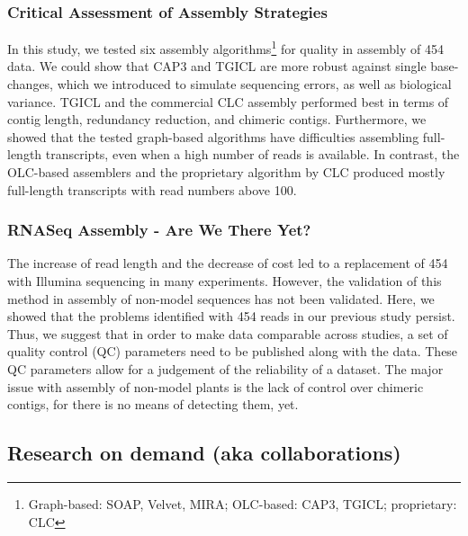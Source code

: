 \subsubsection{Critical Assessment of Assembly Strategies
\cite{mp_Braeutigam2011}}

In this study, we tested six assembly algorithms\footnote{Graph-based: SOAP, Velvet, MIRA; OLC-based: CAP3, TGICL; proprietary: CLC} for quality in  assembly of 454 data. We could show that CAP3 and TGICL are more robust against single base-changes, which we introduced to simulate sequencing errors, as well as biological variance. TGICL and the commercial CLC  assembly performed best in terms of contig length, redundancy reduction, and chimeric contigs.
Furthermore, we showed that the tested graph-based algorithms have difficulties assembling full-length transcripts, even when a high number of reads is available. In contrast, the OLC-based assemblers and the proprietary algorithm by CLC produced mostly full-length transcripts with read numbers above 100.

\subsubsection{RNASeq Assembly - Are We There Yet?
\cite{mp_Schliesky2012}}

The increase of read length and the decrease of cost led to a replacement of 454 with Illumina sequencing in many experiments. However, the validation of this method in  assembly of non-model sequences has not been validated. Here, we showed that the problems identified with 454 reads in our previous study \cite{mp_Braeutigam2011} persist. Thus, we suggest that in order to make data comparable across studies, a set of quality control (QC) parameters need to be published along with the data. These QC parameters allow for a judgement of the reliability of a dataset.
The major issue with  assembly of non-model plants is the lack of control over chimeric contigs, for there is no means of detecting them, yet.

\subsection{Research on demand (aka collaborations)}


